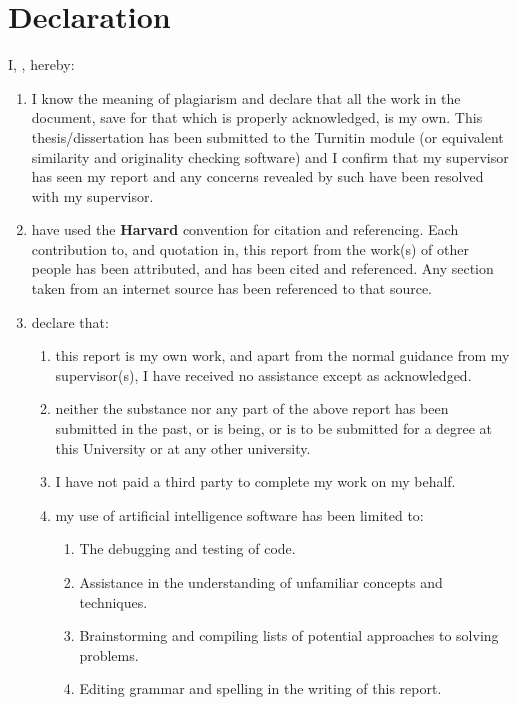 \chapter{Declaration}
\label{ch:decl}

I, \textbf{\auth}, hereby:

\begin{enumerate}[label=\arabic*.]
    \item I know the meaning of plagiarism and declare that all the work in the document, save for that which is properly acknowledged, is my own. This thesis/dissertation has been submitted to the Turnitin module (or  equivalent similarity and originality checking software) and I confirm that my supervisor has seen my report and any concerns revealed by such have been resolved with my supervisor.

    \item have used the {\bf Harvard} convention for citation and referencing. Each contribution to, and quotation in, this report from the work(s) of other people has been attributed, and has been cited and referenced. Any section taken from an internet source has been referenced to that source.

    \item declare that: 
    \begin{enumerate}[label=\alph*.]
        \item this report is my own work, and apart from the normal guidance from my supervisor(s), I have received no assistance except as acknowledged.
        
        \item neither the substance nor any part of the above report has been submitted in the past, or is being, or is to be submitted for a degree at this University or at any other university.
        
        \item I have not paid a third party to complete my work on my behalf.
        
        \item my use of artificial intelligence software has been limited to:
        
        \vspace{1em}
        \begin{enumerate}[label=\roman*.]
            \item The debugging and testing of code.
            \item Assistance in the understanding of unfamiliar concepts and techniques.
            \item Brainstorming and compiling lists of potential approaches to solving problems.
            \item Editing grammar and spelling in the writing of this report.
        \end{enumerate}
        \vspace{1em}
    \end{enumerate}


\end{enumerate}
